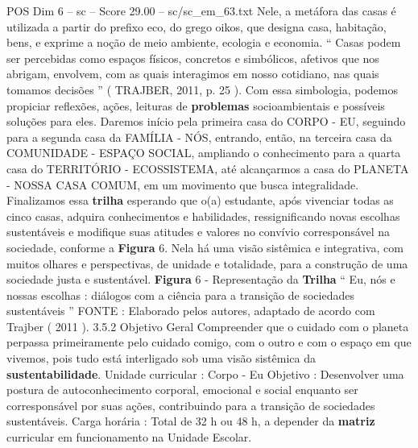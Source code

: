\begin{textsample}{POS Dim 6 – sc – Score 29.00 – sc/sc\_em\_63.txt}
Nele, a metáfora das casas é utilizada a partir do prefixo eco, do grego oikos, que designa casa, habitação, bens, e exprime a noção de meio ambiente, ecologia e economia. “ Casas podem ser percebidas como espaços físicos, concretos e simbólicos, afetivos que nos abrigam, envolvem, com as quais interagimos em nosso cotidiano, nas quais tomamos decisões ” ( TRAJBER, 2011, p. 25 ).
Com essa simbologia, podemos propiciar reflexões, ações, leituras de \textbf{problemas} socioambientais e possíveis soluções para eles.
Daremos início pela primeira casa do CORPO - EU, seguindo para a segunda casa da FAMÍLIA - NÓS, entrando, então, na terceira casa da COMUNIDADE - ESPAÇO SOCIAL, ampliando o conhecimento para a quarta casa do TERRITÓRIO - ECOSSISTEMA, até alcançarmos a casa do PLANETA - NOSSA CASA COMUM, em um movimento que busca integralidade.
Finalizamos essa \textbf{trilha} esperando que o(a) estudante, após vivenciar todas as cinco casas, adquira conhecimentos e habilidades, ressignificando novas escolhas sustentáveis e modifique suas atitudes e valores no convívio corresponsável na sociedade, conforme a \textbf{Figura} 6.
Nela há uma visão sistêmica e integrativa, com muitos olhares e perspectivas, de unidade e totalidade, para a construção de uma sociedade justa e sustentável. \textbf{Figura} 6 - Representação da \textbf{Trilha} “ Eu, nós e nossas escolhas : diálogos com a ciência para a transição de sociedades sustentáveis ” FONTE : Elaborado pelos autores, adaptado de acordo com Trajber ( 2011 ). 3.5.2 Objetivo Geral Compreender que o cuidado com o planeta perpassa primeiramente pelo cuidado comigo, com o outro e com o espaço em que vivemos, pois tudo está interligado sob uma visão sistêmica da \textbf{sustentabilidade}.
Unidade curricular : Corpo - Eu Objetivo : Desenvolver uma postura de autoconhecimento corporal, emocional e social enquanto ser corresponsável por suas ações, contribuindo para a transição de sociedades sustentáveis.
Carga horária : Total de 32 h ou 48 h, a depender da \textbf{matriz} curricular em funcionamento na Unidade Escolar.

\end{textsample}
